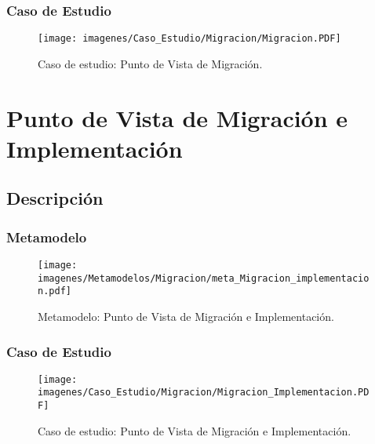 \subsubsection{Caso de Estudio}


\begin{figure}[H]
	\centering
	\texttt{[image: imagenes/Caso\_Estudio/Migracion/Migracion.PDF]}
	\caption{Caso de estudio: Punto de Vista de Migración.}
	\label{fig:gap_analysis}
\end{figure}

\section{Punto de Vista de Migración e Implementación}
\subsection{Descripción}


\subsubsection{Metamodelo}
\begin{figure}[H]
	\centering
	\texttt{[image: imagenes/Metamodelos/Migracion/meta\_Migracion\_implementacion.pdf]}
	\caption{Metamodelo: Punto de Vista de Migración e Implementación.}
	\label{fig:gap_analysis}
\end{figure}

\subsubsection{Caso de Estudio}


\begin{figure}[H]
	\centering
	\texttt{[image: imagenes/Caso\_Estudio/Migracion/Migracion\_Implementacion.PDF]}
	\caption{Caso de estudio: Punto de Vista de Migración e Implementación.}
	\label{fig:gap_analysis}
\end{figure}

